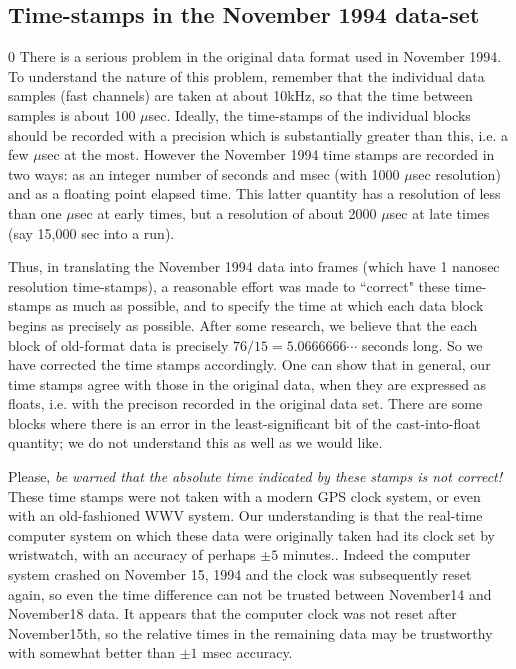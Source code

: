 \subsection{Time-stamps in the November 1994 data-set}
\label{ss:timestamp}
\setcounter{equation}0
There is a serious problem in the original data format used in November
1994.  To understand the nature of this problem, remember that the
individual data samples (fast channels) are taken at about 10kHz,
so that the time between samples is about 100 $\mu$sec.  Ideally, the
time-stamps of the individual blocks should be recorded with a precision which
is substantially greater than this, i.e. a few $\mu$sec at the most.
However the November 1994 time stamps are recorded in two ways:  as an
integer number of seconds and msec (with 1000 $\mu$sec resolution) and
as a floating point elapsed time.  This latter quantity has a resolution
of less than one $\mu$sec at early times, but a resolution of about 2000
$\mu$sec at late times (say 15,000 sec into a run).

Thus, in translating the November 1994 data into frames (which have
1 nanosec resolution time-stamps), a reasonable effort was made
to ``correct" these time-stamps as much as possible, and to specify
the time at which each data block begins as precisely as possible.
After some research, we believe that the each block of old-format data is
precisely $76/15=5.0666666 \cdots$ seconds long.  So we have corrected
the time stamps accordingly.  One can show that in general, our time
stamps agree with those in the original data, when they are expressed
as floats, i.e. with the precison recorded in the original data set.
There are some blocks where there is an error in the least-significant
bit of the cast-into-float quantity; we do not understand this as well
as we would like.

Please, {\it be warned that the absolute time indicated by these stamps
is not correct!} These time stamps were not taken with a modern GPS clock
system, or even with an old-fashioned WWV system.  Our understanding is
that the real-time computer system on which these data were originally
taken had its clock set by wristwatch, with an accuracy of perhaps
$\pm 5$ minutes..  Indeed the computer system crashed on November 15,
1994 and the clock was subsequently reset again, so even the time
difference can not be trusted between November14 and November18 data.
It appears that the computer clock was not reset after November15th,
so the relative times in the remaining data may be trustworthy with
somewhat better than $\pm 1$ msec accuracy.

